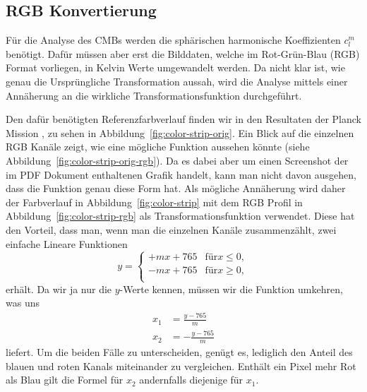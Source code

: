 \subsection{RGB Konvertierung}

Für die Analyse des CMBs werden die sphärischen harmonische Koeffizienten 
$c_l^m$ benötigt. Dafür müssen aber erst die Bilddaten, welche im Rot-Grün-Blau 
(RGB) Format vorliegen, in Kelvin Werte umgewandelt werden. Da nicht klar ist, 
wie genau die Ursprüngliche Transformation aussah, wird die Analyse mittels 
einer Annäherung an die wirkliche Transformationsfunktion durchgeführt.

Den dafür benötigten Referenzfarbverlauf finden wir in den Resultaten der 
Planck Mission \cite{cmb:planck_overview}, zu sehen in 
Abbildung~\ref{fig:color-strip-orig}. Ein Blick auf die einzelnen RGB Kanäle 
zeigt, wie eine mögliche Funktion aussehen könnte (siehe 
Abbildung~\ref{fig:color-strip-orig-rgb}). Da es dabei aber um einen Screenshot 
der im PDF Dokument enthaltenen Grafik handelt, kann man nicht davon ausgehen, 
dass die Funktion genau diese Form hat. Als mögliche Annäherung wird daher der 
Farbverlauf in Abbildung~\ref{fig:color-strip} mit dem RGB Profil in 
Abbildung~\ref{fig:color-strip-rgb} als Transformationsfunktion verwendet. 
Diese hat den Vorteil, dass man, wenn man die einzelnen Kanäle zusammenzählt, 
zwei einfache Lineare Funktionen
\begin{equation*}
	y =
	\begin{cases}
		+mx + 765 & \text{für} x \leq 0,\\
		-mx + 765 & \text{für} x \geq 0,\\
	\end{cases}
\end{equation*}
erhält. Da wir ja nur die $y$-Werte kennen, müssen wir die Funktion umkehren, 
was uns
\begin{align*}
	x_1 &= \frac{y - 765}{m}\\
	x_2 &= -\frac{y - 765}{m}
\end{align*}
liefert. Um die beiden Fälle zu unterscheiden, genügt es, lediglich den Anteil 
des blauen und roten Kanals miteinander zu vergleichen. Enthält ein Pixel mehr 
Rot als Blau gilt die Formel für $x_2$ andernfalls diejenige für $x_1$.

